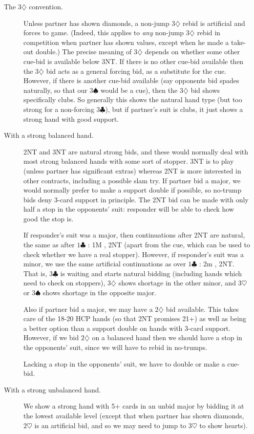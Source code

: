 \documentclass{article}
\newcommand{\sz}{\spadesuit}
\newcommand{\hz}{\heartsuit}
\newcommand{\dz}{\diamondsuit}
\newcommand{\cz}{\clubsuit}
\begin{document}
\begin{description}
\item[The $3\dz$ convention.] Unless partner has shown diamonds, a non-jump $3\dz$ rebid is artificial and forces to game. (Indeed, this applies to \emph{any} non-jump $3\dz$ rebid in competition when partner has shown values, except when he made a take-out double.) The precise meaning of $3\dz$ depends on whether some other cue-bid is available below 3NT. If there is no other cue-bid available then the $3\dz$ bid acts as a general forcing bid, as a substitute for the cue. However, if there is another cue-bid available (say opponents bid spades naturally, so that our $3\sz$ would be a cue), then the $3\dz$ bid shows specifically clubs. So generally this shows the natural hand type (but too strong for a non-forcing $3\cz$), but if partner's suit is clubs, it just shows a strong hand with good support.

\item[With a strong balanced hand.] 2NT and 3NT are natural strong bids, and these would normally deal with most strong balanced hands with some sort of stopper. 3NT is to play (unless partner has significant extras) whereas 2NT is more interested in other contracts, including a possible slam try. If partner bid a major, we would normally prefer to make a support double if possible, so no-trump bids deny 3-card support in principle. The 2NT bid can be made with only half a stop in the opponents' suit: responder will be able to check how good the stop is.

If responder's suit was a major, then continuations after 2NT are natural, the same as after $1\cz$ : 1M , 2NT (apart from the cue, which can be used to check whether we have a real stopper). However, if responder's suit was a minor, we use the same artificial continuations as over $1\cz$ : 2m , 2NT. That is, $3\cz$ is waiting and starts natural bidding (including hands which need to check on stoppers), $3\dz$ shows shortage in the other minor, and $3\hz$ or $3\sz$ shows shortage in the opposite major.

Also if partner bid a major, we may have a $2\dz$ bid available. This takes care of the 18-20 HCP hands (so that 2NT promises 21+) as well as being a better option than a support double on hands with 3-card support. However, if we bid $2\dz$ on a balanced hand then we should have a stop in the opponents' suit, since we will have to rebid in no-trumps.

Lacking a stop in the opponents' suit, we have to double or make a cue-bid.

\item[With a strong unbalanced hand.] We show a strong hand with 5+ cards in an unbid major by bidding it at the lowest available level (except that when partner has shown diamonds, $2\hz$ is an artificial bid, and so we may need to jump to $3\hz$ to show hearts).


\end{description}
\end{document}
